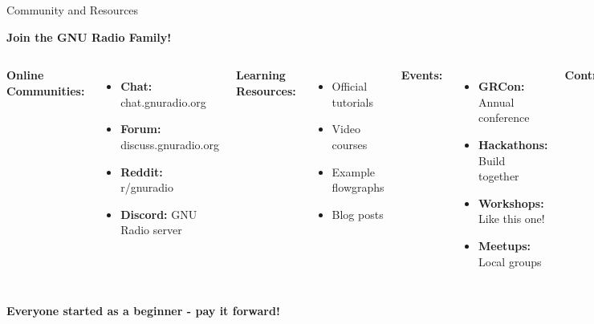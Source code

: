 \documentclass[aspectratio=169,11pt]{beamer}
\begin{document}
\begin{frame}{Community and Resources}
\begin{center}
\Large\textbf{Join the GNU Radio Family!}
\end{center}
\vspace{1em}
\begin{columns}
\textbf{Online Communities:}
\begin{itemize}
    \item \textbf{Chat:} chat.gnuradio.org
    \item \textbf{Forum:} discuss.gnuradio.org
    \item \textbf{Reddit:} r/gnuradio
    \item \textbf{Discord:} GNU Radio server
\end{itemize}
\vspace{0.5em}
\textbf{Learning Resources:}
\begin{itemize}
    \item Official tutorials
    \item Video courses
    \item Example flowgraphs
    \item Blog posts
\end{itemize}

\textbf{Events:}
\begin{itemize}
    \item \textbf{GRCon:} Annual conference
    \item \textbf{Hackathons:} Build together
    \item \textbf{Workshops:} Like this one!
    \item \textbf{Meetups:} Local groups
\end{itemize}
\vspace{0.5em}
\textbf{Contributing:}
\begin{itemize}
    \item Share your projects
    \item Help newcomers
    \item Report bugs
    \item Write tutorials
\end{itemize}
\end{columns}
\vspace{1em}
\begin{center}\colorbox{yellow!20}{\parbox{0.9\textwidth}{
\centering
\large\textbf{Everyone started as a beginner - pay it forward!}
}}\end{center}
\end{frame}
\end{document}
